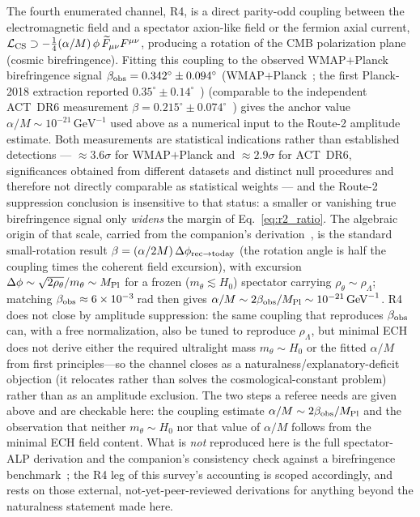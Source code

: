 \documentclass[aps,prd,twocolumn,superscriptaddress,showpacs,preprintnumbers,nofootinbib,longbibliography,floatfix]{revtex4-2}
\newcommand{\MPl}{M_{\rm Pl}}
\begin{document}
The fourth enumerated channel, R4, is a direct parity-odd coupling between
the electromagnetic field and a spectator axion-like field or the fermion
axial current, $\mathcal{L}_{\rm CS}\supset
-\tfrac14(\alpha/M)\,\phi\,\widetilde F_{\mu\nu}F^{\mu\nu}$, producing a
rotation of the CMB polarization plane (cosmic birefringence). Fitting
this coupling to the observed WMAP$+$Planck birefringence signal
$\beta_{\rm obs}=0.342^\circ\pm0.094^\circ$ (WMAP$+$Planck~\cite{Eskilt2022};
the first Planck-2018 extraction reported
$0.35^\circ\pm0.14^\circ$~\cite{Minami2020})
(comparable to the independent ACT~DR6 measurement
$\beta=0.215^\circ\pm0.074^\circ$~\cite{DiegoPalazuelos2025}) gives the anchor value
$\alpha/M\sim10^{-21}\,\text{GeV}^{-1}$ used above as a numerical input to
the Route-2 amplitude estimate. Both measurements are statistical
indications rather than established detections --- ${\approx}3.6\sigma$
for WMAP$+$Planck and ${\approx}2.9\sigma$ for ACT~DR6, significances
obtained from different datasets and distinct null procedures and
therefore not directly comparable as statistical weights --- and the
Route-2 suppression conclusion is insensitive to that status: a smaller
or vanishing true birefringence signal only \emph{widens} the margin of
Eq.~\eqref{eq:r2_ratio}. The algebraic origin of that scale,
carried from the companion's derivation~\cite{Golden2026P1a}, is the
standard small-rotation result $\beta=(\alpha/2M)\,
\Delta\phi_{\rm rec\to today}$ (the rotation angle is half the coupling
times the coherent field excursion), with excursion
$\Delta\phi\sim\sqrt{2\rho_\theta}/m_\theta\sim\MPl$ for a frozen
($m_\theta\lesssim H_0$) spectator carrying $\rho_\theta\sim\rho_\Lambda$;
matching $\beta_{\rm obs}\approx6\times10^{-3}\,$rad then gives
$\alpha/M\sim2\beta_{\rm obs}/\MPl\sim10^{-21}\,\text{GeV}^{-1}$.
R4 does not close by amplitude
suppression: the same coupling that reproduces $\beta_{\rm obs}$ can, with
a free normalization, also be tuned to reproduce $\rho_\Lambda$, but
minimal ECH does not derive either the required ultralight mass
$m_\theta\sim H_0$ or the fitted $\alpha/M$ from first principles---so the
channel closes as a naturalness/explanatory-deficit objection (it
relocates rather than solves the cosmological-constant problem) rather
than as an amplitude exclusion. The two steps a referee needs are given
above and are checkable here: the coupling estimate
$\alpha/M\sim2\beta_{\rm obs}/\MPl$ and the observation that neither
$m_\theta\sim H_0$ nor that value of $\alpha/M$ follows from the minimal
ECH field content. What is \emph{not} reproduced here is the full
spectator-ALP derivation and the companion's consistency check against a
birefringence benchmark~\cite{Golden2026P1a,Golden2026P1b}; the R4 leg of
this survey's accounting is scoped accordingly, and rests on those
external, not-yet-peer-reviewed derivations for anything beyond the
naturalness statement made here.
\end{document}
